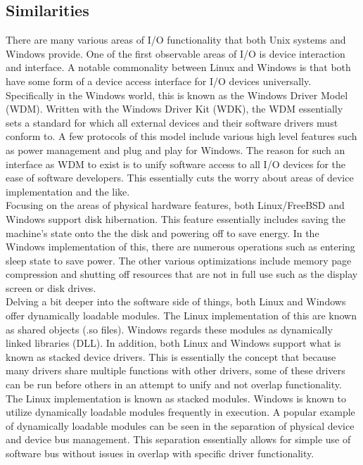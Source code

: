 \documentclass[letterpaper,10pt,titlepage]{article}
\begin{document}
\subsection{Similarities}

There are many various areas of I/O functionality that both Unix systems and Windows provide.  One of the first observable areas of I/O is device interaction and interface.  A notable commonality between Linux and Windows is that both have some form of a device access interface for I/O devices universally.  Specifically in the Windows world, this is known as the Windows Driver Model (WDM).  Written with the Windows Driver Kit (WDK), the WDM essentially sets a standard for which all external devices and their software drivers must conform to.  A few protocols of this model include various high level features such as power management and plug and play for Windows.\cite{mwi8}  The reason for such an interface as WDM to exist is to unify software access to all I/O devices for the ease of software developers.  This essentially cuts the worry about areas of device implementation and the like.\\

Focusing on the areas of physical hardware features, both Linux/FreeBSD and Windows support disk hibernation.  This feature essentially includes saving the machine's state onto the the disk and powering off to save energy.  In the Windows implementation of this, there are numerous operations such as entering sleep state to save power.  The other various optimizations include memory page compression and shutting off resources that are not in full use such as the display screen or disk drives.\cite{mwi8}\\

Delving a bit deeper into the software side of things, both Linux and Windows offer dynamically loadable modules.  The Linux implementation of this are known as shared objects (.so files).  Windows regards these modules as dynamically linked libraries (DLL).  In addition, both Linux and Windows support what is known as stacked device drivers.  This is essentially the concept that because many drivers share multiple functions with other drivers, some of these drivers can be run before others in an attempt to unify and not overlap functionality.\cite{stackedDeviceDrivers}  The Linux implementation is known as stacked modules.  Windows is known to utilize dynamically loadable modules frequently in execution.  A popular example of dynamically loadable modules can be seen in the separation of physical device and device bus management.\cite{mwi8} This separation essentially allows for simple use of software bus without issues in overlap with specific driver functionality.\\
\end{document}
